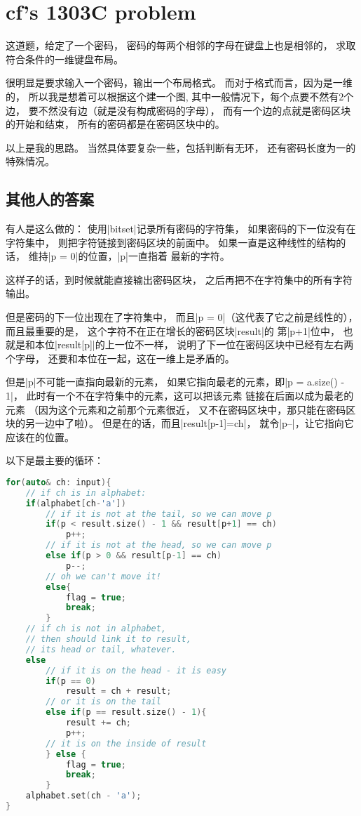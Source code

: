 \section{cf's 1303C problem}

这道题，给定了一个密码，
密码的每两个相邻的字母在键盘上也是相邻的，
求取符合条件的一维键盘布局。

很明显是要求输入一个密码，输出一个布局格式。
而对于格式而言，因为是一维的，
所以我是想着可以根据这个建一个图,
其中一般情况下，每个点要不然有2个边，
要不然没有边（就是没有构成密码的字母），
而有一个边的点就是密码区块的开始和结束，
所有的密码都是在密码区块中的。

以上是我的思路。
当然具体要复杂一些，包括判断有无环，
还有密码长度为一的特殊情况。

\subsection{其他人的答案}
有人是这么做的：
使用\vb|bitset|记录所有密码的字符集，
如果密码的下一位没有在字符集中，
则把字符链接到密码区块的前面中。
如果一直是这种线性的结构的话，
维持\vb|p = 0|的位置，\vb|p|一直指着
最新的字符。

这样子的话，到时候就能直接输出密码区块，
之后再把不在字符集中的所有字符输出。

但是密码的下一位出现在了字符集中，
而且\vb|p = 0|（这代表了它之前是线性的），
而且最重要的是，
这个字符不在正在增长的密码区块\vb|result|的
第\vb|p+1|位中，
也就是和本位\vb|result[p]|的上一位不一样，
说明了下一位在密码区块中已经有左右两个字母，
还要和本位在一起，这在一维上是矛盾的。

但是\vb|p|不可能一直指向最新的元素，
如果它指向最老的元素，即\vb|p = a.size() - 1|，
此时有一个不在字符集中的元素，这可以把该元素
链接在后面以成为最老的元素
（因为这个元素和之前那个元素很近，
又不在密码区块中，那只能在密码区块的另一边中了啦）。
但是在的话，而且\vb|result[p-1]=ch|，
就令\vb|p--|，让它指向它应该在的位置。

以下是最主要的循环：
\begin{lstlisting}[language=C++]
for(auto& ch: input){
    // if ch is in alphabet:
    if(alphabet[ch-'a'])
        // if it is not at the tail, so we can move p
        if(p < result.size() - 1 && result[p+1] == ch)
            p++;
        // if it is not at the head, so we can move p
        else if(p > 0 && result[p-1] == ch)
            p--;
        // oh we can't move it!
        else{
            flag = true;
            break;
        }
    // if ch is not in alphabet, 
    // then should link it to result,
    // its head or tail, whatever.
    else
        // if it is on the head - it is easy
        if(p == 0)
            result = ch + result;
        // or it is on the tail
        else if(p == result.size() - 1){
            result += ch;
            p++;
        // it is on the inside of result
        } else {
            flag = true;
            break;
        }
    alphabet.set(ch - 'a');
}
\end{lstlisting}


